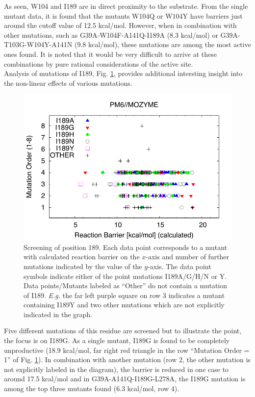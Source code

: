 As seen, W104 and I189 are in direct proximity to the substrate.
From the single mutant data, it is found that the mutants W104Q or W104Y have barriers just around the cutoff value of 12.5 kcal/mol.
However, when in combination with other mutations, such as G39A-W104F-A141Q-I189A (8.3 kcal/mol) or G39A-T103G-W104Y-A141N (9.8 kcal/mol), these mutations are among the most active ones found.
It is noted that it would be very difficult to arrive at these combinations by pure rational considerations of the active site.\\
Analysis of mutations of I189, Fig. \ref{fig:i189g}, provides additional intersting insight into the non-linear effects of various mutations.
\begin{figure}[htbp] 
\includegraphics[width=0.95\linewidth]{011-diag_eval_scre_setL-i189.pdf}
\caption{
Screening of position 189.
Each data point corresponds to a mutant with calculated reaction barrier on the $x$-axis and number of further mutations indicated by the value of the $y$-axis.
The data point symbols indicate either of the point mutations I189A/G/H/N or Y.
Data points/Mutants labeled as ``Other'' do not contain a mutation of I189.
\textit{E.g.} the far left purple square on row 3 indicates a mutant containing I189Y and two other mutations which are not explicitly indicated in the graph.
}
\label{fig:i189g}
\end{figure}
Five different mutations of this residue are screened but to illustrate the point, the focus is on I189G.
As a single mutant, I189G is found to be completely unproductive (18.9 kcal/mol, far right red triangle in the row ``Mutation Order = 1'' of Fig. \ref{fig:i189g}).
In combination with another mutation (row 2, the other mutation is not explicitly labeled in the diagram), the barrier is reduced in one case to around 17.5 kcal/mol and in G39A-A141Q-I189G-L278A, the I189G mutation is among the top three mutants found (6.3 kcal/mol, row 4).
